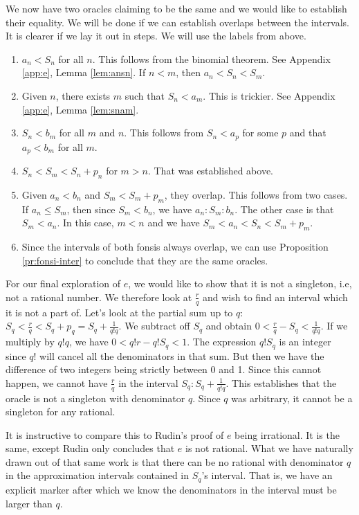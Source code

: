 \documentclass[12pt]{article}
\begin{document}
We now have two oracles claiming to be the same and we would like to establish their equality. We will be done if we can establish overlaps between the intervals. It is clearer if we lay it out in steps. We will use the labels from above. 
\begin{enumerate}
    \item $a_n < S_n$ for all $n$. This follows from the binomial theorem. See Appendix \ref{app:e}, Lemma \ref{lem:ansn}. If $n < m$, then $a_n < S_n < S_m$.
    \item Given $n$, there exists $m$ such that $S_n < a_m$. This is trickier. See Appendix \ref{app:e}, Lemma \ref{lem:snam}. 
    \item $S_n < b_m$ for all $m$ and $n$. This follows from $S_n < a_p$ for some $p$ and that $a_p < b_m$ for all $m$.
    \item $S_n < S_m < S_n + p_n$ for $m > n$. That was established above. 
    \item Given $a_n < b_n$ and $S_m < S_m + p_m$, they overlap. This follows from two cases. If $a_n \leq S_m$, then since $S_m < b_n$, we have $a_n : S_m : b_n$. The other case is that $S_m < a_n$. In this case, $m < n$ and we have $S_m < a_n < S_n < S_m + p_m$. 
    \item Since the intervals of both fonsis always overlap, we can use Proposition \ref{pr:fonsi-inter} to conclude that they are the same oracles. 
\end{enumerate}

For our final exploration of $e$, we would like to show that it is not a singleton, i.e, not a rational number. We therefore look at $\tfrac{r}{q}$ and wish to find an interval which it is not a part of.  Let's look at the partial sum up to $q$:  $S_q < \tfrac{r}{q} <  S_q + p_q = S_q + \frac{1}{q!q}$. We subtract off $S_q$ and obtain $0 < \tfrac{r}{q} - S_q < \tfrac{1}{q! q}$. If we multiply by $q! q$, we have $0 < q! r - q!S_q < 1$.  The expression $q! S_q$ is an integer since $q!$ will cancel all the denominators in that sum. But then we have the difference of two integers being strictly between 0 and 1. Since this cannot happen, we cannot have $\tfrac{r}{q}$ in the interval $S_q : S_q + \frac{1}{q! q}$. This establishes that the oracle is not a singleton with denominator $q$. Since $q$ was arbitrary, it cannot be a singleton for any rational. 

It is instructive to compare this to Rudin's proof of $e$ being irrational. It is the same, except Rudin only concludes that $e$ is not rational. What we have naturally drawn out of that same work is that there can be no rational with denominator $q$ in the approximation intervals contained in $S_q$'s interval. That is, we have an explicit marker after which we know the denominators in the interval must be larger than $q$. 
\end{document}
